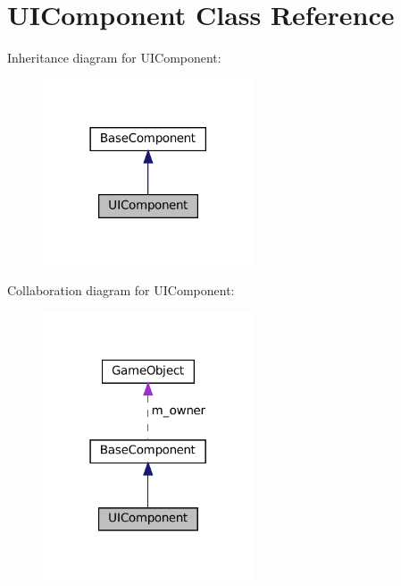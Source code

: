\hypertarget{classUIComponent}{}\section{U\+I\+Component Class Reference}
\label{classUIComponent}


Inheritance diagram for U\+I\+Component\+:
\nopagebreak
\begin{figure}[H]
\begin{center}
\leavevmode
\includegraphics[width=177pt]{classUIComponent__inherit__graph}
\end{center}
\end{figure}


Collaboration diagram for U\+I\+Component\+:
\nopagebreak
\begin{figure}[H]
\begin{center}
\leavevmode
\includegraphics[width=178pt]{classUIComponent__coll__graph}
\end{center}
\end{figure}
